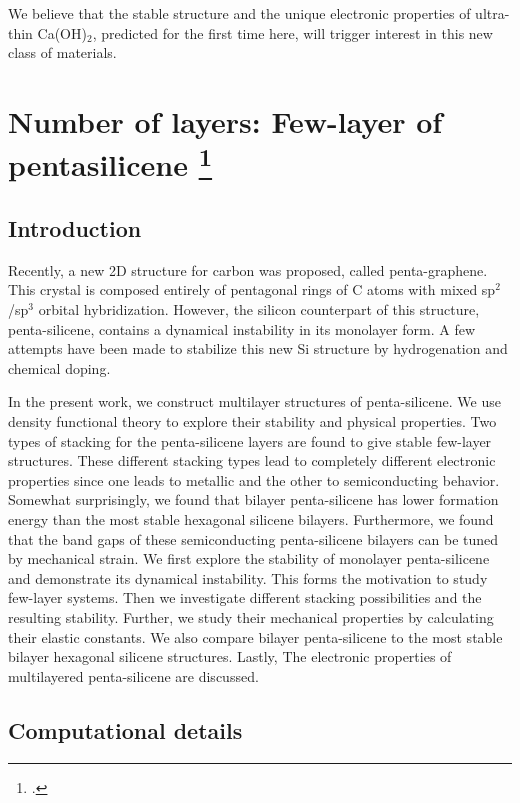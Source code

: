 We believe that the stable structure and the unique electronic properties of ultra-thin 
Ca(OH)$_2$, predicted for the first time here, will trigger interest in this 
new class of materials. 

\section[Number of layers: Few-layer of pentasilicene]{Number of layers: Few-layer of pentasilicene \footcite[This work is published:][]{Aierken2016.pentasilicene} \label{pSi_layers}}

\subsection{Introduction\label{intro}}

Recently, a new 2D structure for carbon was proposed, called penta-graphene\cite{Zhang2015}. This crystal is composed entirely of pentagonal rings of C atoms with mixed sp$^2$/sp$^3$ orbital hybridization.  However, the silicon counterpart of this structure, penta-silicene, contains a dynamical instability in its monolayer form. A few attempts have been made to stabilize this new Si structure by hydrogenation\cite{Ding2015} and chemical doping\cite{Li2015b}. 

In the present work, we construct multilayer structures of penta-silicene. We use density functional theory to explore their stability and physical properties. Two types of stacking for the penta-silicene layers are found to give stable few-layer structures. These different stacking types lead to completely different electronic properties since one leads to metallic and the other to semiconducting behavior. Somewhat surprisingly, we found that bilayer penta-silicene has lower formation energy than the most stable hexagonal silicene bilayers. Furthermore, we found that the band gaps of these semiconducting penta-silicene bilayers can be tuned by mechanical strain. We first explore the stability of monolayer penta-silicene and demonstrate its dynamical instability. This forms the motivation to study few-layer systems. Then we investigate different stacking possibilities and the resulting stability. Further, we study their mechanical properties by calculating their elastic constants.  We also compare bilayer penta-silicene to the most stable bilayer hexagonal silicene structures. Lastly, The electronic properties of multilayered penta-silicene are discussed.

\subsection{Computational details}


